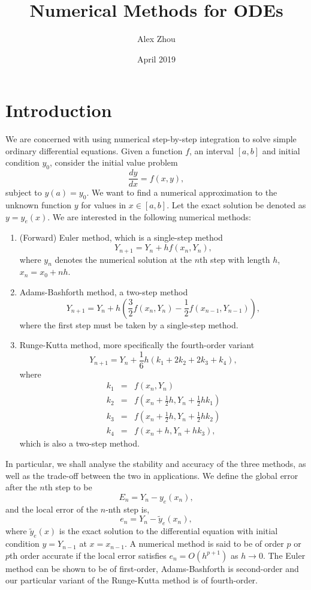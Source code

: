 \documentclass{article}
\title{Numerical Methods for ODEs}
\author{Alex Zhou}
\date{April 2019}
\begin{document}
\maketitle

\section{Introduction}

We are concerned with using numerical step-by-step integration to solve simple ordinary differential equations. Given a function \(f\), an interval \([a,b]\) and initial condition \(y_0\), consider the initial value problem
\[ \frac{dy}{dx} = f(x,y),  \]
subject to \(y(a) = y_0\). We want to find a numerical approximation to the unknown function \(y\) for values in \(x \in [a,b]\). Let the exact solution be denoted as \(y = y_e(x)\). We are interested in the following numerical methods:
\begin{enumerate}
    \item (Forward) Euler method, which is a single-step method
    \[ Y_{n+1} = Y_n + hf(x_n, Y_n), \]
    where \(y_n\) denotes the numerical solution at the \(n\)th step with length \(h\), \(x_n = x_0 + nh\).
    \item Adams-Bashforth method, a two-step method
    \[ Y_{n+1} = Y_n + h\left(\frac{3}{2}f(x_n, Y_n) - \frac{1}{2}f(x_{n-1}, Y_{n-1})\right), \]
    where the first step must be taken by a single-step method.
    \item Runge-Kutta method, more specifically the fourth-order variant
    \[ Y_{n+1} = Y_n + \frac{1}{6}h(k_1 + 2k_2 + 2k_3 + k_4), \]
    where
    \begin{eqnarray*}
        k_1 &=& f(x_n, Y_n) \\
        k_2 &=& f(x_n + \textstyle\frac{1}{2}h, Y_n + \frac{1}{2}hk_1) \\
        k_3 &=& f(x_n + \textstyle\frac{1}{2}h, Y_n + \frac{1}{2}hk_2) \\
        k_4 &=& f(x_n + h, Y_n + hk_3),
    \end{eqnarray*}
    which is also a two-step method.
\end{enumerate}
In particular, we shall analyse the stability and accuracy of the three methods, as well as the trade-off between the two in applications. We define the global error after the \(n\)th step to be
\[ E_n = Y_n - y_e(x_n), \]
and the local error of the \(n\)-nth step is,
\[ e_n = Y_n - \tilde{y}_e(x_n), \]
where \(\tilde{y}_e(x)\) is the exact solution to the differential equation with initial condition \(y = Y_{n-1}\) at \(x = x_{n-1}\). A numerical method is said to be of order \(p\) or \(p\)th order accurate if the local error satisfies \(e_n = O(h^{p+1})\) as \(h \to 0\). The Euler method can be shown to be of first-order, Adams-Bashforth is second-order and our particular variant of the Runge-Kutta method is of fourth-order.
\end{document}
